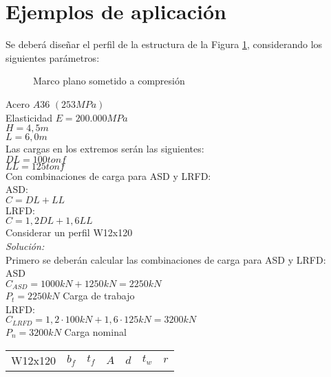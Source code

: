 \section{Ejemplos de aplicación}
\begin{example}
Se deberá diseñar el perfil de la estructura de la Figura \ref{fig:marco1}, considerando los siguientes parámetros:\\
\begin{figure}
    \centering
    
    \caption{Marco plano sometido a compresión}
    \label{fig:marco1}
\end{figure}
Acero $A36$ $(253 MPa)$\\
Elasticidad $E=200.000 MPa$\\
$H=4,5 m$\\
$L=6,0 m$\\
Las cargas en los extremos serán las siguientes:\\
$DL=100 tonf$\\
$LL=125 tonf$\\
Con combinaciones de carga para ASD y LRFD:\\
ASD:\\
$C=DL+LL$\\
LRFD:\\
$C=1,2DL+1,6LL$\\
\vspace{5mm}
Considerar un perfil W12x120\\
\vspace{5mm}
\textit{Solución:}\\
\vspace{5mm}
Primero se deberán calcular las combinaciones de carga para ASD y LRFD:\\
ASD\\
$C_{ASD}=1000kN+1250kN=2250 kN$\\
$P_{t}=2250kN$ Carga de trabajo\\
LRFD:\\
$C_{LRFD}=1,2\cdot100kN+1,6\cdot 125kN=3200 kN $\\
$P_{n}=3200kN$ Carga nominal\\
\begin{table}[]
\centering
\begin{tabular}{ccccccc}
\hline
\multirow{2}{*}{W12x120} & $b_f$      & $t_f$      & $A$        & $d$       & $t_w$     & $r$     \\ \cline{2-7} 

\end{tabular}
\end{table}
\end{example}
